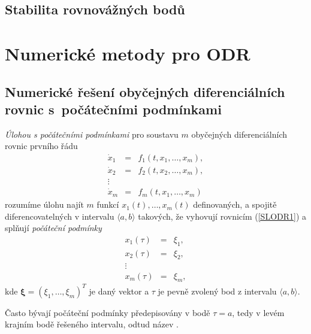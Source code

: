 \documentclass[a4paper, 12pt]{book}
\theoremstyle{definition}
\def\vc#1{\mathbf{\boldsymbol{#1}}}     %
\begin{document}
\section{Stabilita rovnovážných bodů}
\label{stabilita_ODR}



\chapter{Numerické metody pro ODR}



\section[Numerické řešení ODR s počátečními podmínkami]{Numerické řešení obyčejných 
diferenciálních rovnic s~počátečními podmínkami}
{\em Úlohou s počátečními podmínkami} pro soustavu $m$ obyčejných 
diferenciálních rovnic prvního řádu
\begin{equation}\label{SLODR1}
\begin{array}{rcl}
\dot x_1&=&f_1(t,x_1,\dots,x_m),\\
\dot x_2&=&f_2(t,x_2,\dots,x_m),\\
\vdots\\
\dot x_m&=&f_m(t,x_1,\dots,x_m)
\end{array}
\end{equation}
rozumíme úlohu najít $m$ funkcí $x_1(t),\dots,x_m(t)$ definovaných, a spojitě 
diferencovatelných v intervalu $\langle a,b\rangle$ takových, že vyhovují 
rovnicím (\ref{SLODR1}) a splňují {\em počáteční podmínky}
\begin{equation}\label{pocp}
\begin{array}{rcl}
x_1(\tau)&=&\xi_1,\\
x_2(\tau)&=&\xi_2,\\
\vdots\\
x_m(\tau)&=&\xi_m,
\end{array}
\end{equation}
kde $\vc\xi=(\xi_1,\dots,\xi_m)^T$ je daný vektor a $\tau$ je pevně zvolený
bod z intervalu $\langle a,b\rangle$.

Často bývají počáteční podmínky předepisovány v bodě $\tau=a$, tedy v levém
krajním bodě řešeného intervalu, odtud název .
\end{document}
